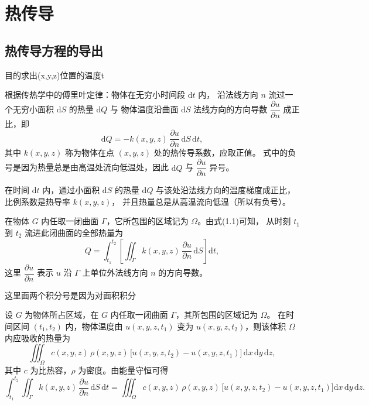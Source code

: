 \chapter{热传导}
\section{热传导方程的导出}
目的求出(x,y,z)位置的温度t
\begin{definition}[傅里叶定律]
根据传热学中的傅里叶定律：物体在无穷小时间段 $\mathrm{d}t$ 内，
沿法线方向 $n$ 流过一个无穷小面积 $\mathrm{d}S$ 的热量 $\mathrm{d}Q$ 与
物体温度沿曲面 $\mathrm{d}S$ 法线方向的方向导数 $\dfrac{\partial u}{\partial n}$ 成正比，即
\[
  \mathrm{d}Q=-k(x,y,z)\,\frac{\partial u}{\partial n}\,\mathrm{d}S\,\mathrm{d}t,
\]
其中 $k(x,y,z)$ 称为物体在点 $(x,y,z)$ 处的热传导系数，应取正值。
式中的负号是因为热量总是由高温处流向低温处，因此 $\mathrm{d}Q$ 与
$\dfrac{\partial u}{\partial n}$ 异号。
\end{definition}
\begin{note}
     在时间 $\mathrm{d}t$ 内，通过小面积 $\mathrm{d}S$ 的热量 $\mathrm{d}Q$
与该处沿法线方向的温度梯度成正比，比例系数是热导率 $k(x,y,z)$，
并且热量总是从高温流向低温（所以有负号）。
\end{note}
在物体 $G$ 内任取一闭曲面 $\Gamma$，它所包围的区域记为 $\Omega$。由式(1.1)可知，
从时刻 $t_1$ 到 $t_2$ 流进此闭曲面的全部热量为
\[
  Q=\int_{t_1}^{t_2}\left[\iint_{\Gamma} k(x,y,z)\,\frac{\partial u}{\partial n}\,\mathrm{d}S\right]\mathrm{d}t,
\tag{1.2}
\]
这里 $\dfrac{\partial u}{\partial n}$ 表示 $u$ 沿 $\Gamma$ 上单位外法线方向 $n$ 的方向导数。
\begin{note}
    这里面两个积分号是因为对面积积分
\end{note}
\begin{theorem}[能量守恒关系]
设 $G$ 为物体所占区域，在 $G$ 内任取一闭曲面 $\Gamma$，其所包围的区域记为 $\Omega$。
在时间区间 $(t_1,t_2)$ 内，物体温度由 $u(x,y,z,t_1)$ 变为 $u(x,y,z,t_2)$，则该体积
$\Omega$ 内应吸收的热量为
\[
  \iiint_{\Omega} c(x,y,z)\,\rho(x,y,z)\,
  \bigl[u(x,y,z,t_2)-u(x,y,z,t_1)\bigr]\,\mathrm{d}x\,\mathrm{d}y\,\mathrm{d}z,
\]
其中 $c$ 为比热容，$\rho$ 为密度。由能量守恒可得
\[
  \int_{t_1}^{t_2}\iint_{\Gamma} k(x,y,z)\,\frac{\partial u}{\partial n}\,\mathrm{d}S\,\mathrm{d}t
  = \iiint_{\Omega} c(x,y,z)\,\rho(x,y,z)\,
  \bigl[u(x,y,z,t_2)-u(x,y,z,t_1)\bigr]\mathrm{d}x\,\mathrm{d}y\,\mathrm{d}z.
  \tag{1.3}
\]
\end{theorem}
